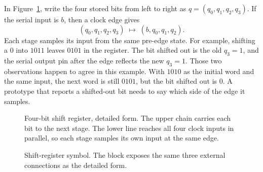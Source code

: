 \documentclass[11pt,oneside]{report}
\theoremstyle{plain}
\theoremstyle{definition}
\theoremstyle{remark}
\begin{document}
In Figure~\ref{fig:sr}, write the four stored bits from left to right as $q=(q_0,q_1,q_2,q_3)$. If the serial input is $b$, then a clock edge gives
\[
(q_0,q_1,q_2,q_3)\;\longmapsto\;(b,q_0,q_1,q_2).
\]
Each stage samples its input from the same pre-edge state. For example, shifting a $0$ into $1011$ leaves $0101$ in the register. The bit shifted out is the old $q_3=1$, and the serial output pin after the edge reflects the new $q_3=1$. Those two observations happen to agree in this example. With $1010$ as the initial word and the same input, the next word is still $0101$, but the bit shifted out is $0$. A prototype that reports a shifted-out bit needs to say which side of the edge it samples.

\begin{figure}[H]
\centering
{}
\caption{Four-bit shift register, detailed form. The upper chain carries each bit to the next stage. The lower line reaches all four clock inputs in parallel, so each stage samples its own input at the same edge.}
\label{fig:sr}
\end{figure}

\begin{figure}[H]
\centering
{}
\caption{Shift-register symbol. The block exposes the same three external connections as the detailed form.}
\label{fig:srg}
\end{figure}
\end{document}

